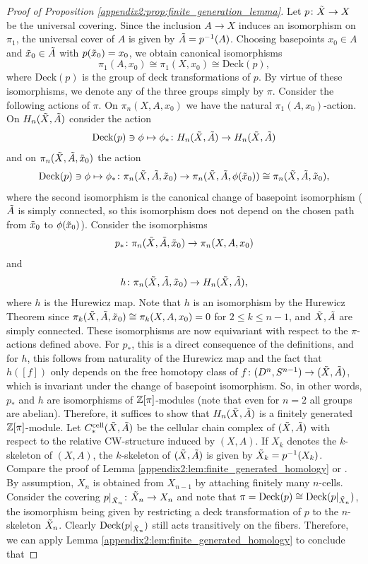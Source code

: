 \begin{proof}[Proof of Proposition \ref{appendix2:prop:finite_generation_lemma}]
    Let $p \colon \tilde{X} \to X$ be the universal covering. Since the inclusion $A \to X$ induces an isomorphism on $\pi_1$, the universal cover of $A$ is given by $\tilde{A} = p^{-1}(A)$. Choosing basepoints $x_0 \in A$ and $\tilde{x}_0 \in \tilde{A}$ with $p(\tilde{x}_0) = x_0$, we obtain canonical isomorphisms 
    \[
    \pi_1(A,x_0) \cong \pi_1(X,x_0) \cong \mathrm{Deck}(p),
    \]
    where $\mathrm{Deck}(p)$ is the group of deck transformations of $p$. By virtue of these isomorphisms, we denote any of the three groups simply by $\pi$. Consider the following actions of $\pi$. On $\pi_n(X,A,x_0)$ we have the natural $\pi_1(A,x_0)$-action. On $H_n(\tilde{X},\tilde{A})$ consider the action
    \[
    \mathrm{Deck}(p) \ni \phi \mapsto \phi_\ast \colon H_n(\tilde{X},\tilde{A}) \to H_n(\tilde{X},\tilde{A})
    \]
    and on $\pi_n(\tilde{X},\tilde{A},\tilde{x}_0)$ the action 
    \[
    \mathrm{Deck}(p) \ni \phi \mapsto \phi_\ast \colon \pi_n(\tilde{X},\tilde{A},\tilde{x}_0) \to \pi_n(\tilde{X},\tilde{A},\phi(\tilde{x}_0)) \cong \pi_n(\tilde{X},\tilde{A},\tilde{x}_0),
    \]
    where the second isomorphism is the canonical change of basepoint isomorphism ($\tilde{A}$ is simply connected, so this isomorphism does not depend on the chosen path from $\tilde{x}_0$ to $\phi(\tilde{x}_0)$). Consider the isomorphisms
    \[
    p_\ast \colon \pi_n(\tilde{X},\tilde{A},\tilde{x}_0) \to \pi_n(X,A,x_0)
    \]
    and 
    \[
    h \colon \pi_n(\tilde{X},\tilde{A},\tilde{x}_0) \to H_n(\tilde{X},\tilde{A}),
    \]
    where $h$ is the Hurewicz map. Note that $h$ is an isomorphism by the Hurewicz Theorem since $\pi_k(\tilde{X},\tilde{A},\tilde{x}_0) \cong \pi_k(X,A,x_0) = 0$ for $2 \leq k \leq n-1$, and $\tilde{X}, \tilde{A}$ are simply connected. These isomorphisms are now equivariant with respect to the $\pi$-actions defined above. For $p_\ast$, this is a direct consequence of the definitions, and for $h$, this follows from naturality of the Hurewicz map and the fact that $h([f])$ only depends on the free homotopy class of $f \colon (D^n,S^{n-1}) \to (\tilde{X},\tilde{A})$, which is invariant under the change of basepoint isomorphism. So, in other words, $p_\ast$ and $h$ are isomorphisms of $\mathbb{Z}[\pi]$-modules (note that even for $n=2$ all groups are abelian). Therefore, it suffices to show that $H_n(\tilde{X},\tilde{A})$ is a finitely generated $\mathbb{Z}[\pi]$-module. Let $C_\ast^\mathrm{cell}(\tilde{X},\tilde{A})$ be the cellular chain complex of $(\tilde{X},\tilde{A})$ with respect to the relative CW-structure induced by $(X,A)$. If $X_k$ denotes the $k$-skeleton of $(X,A)$, the $k$-skeleton of $(\tilde{X},\tilde{A})$ is given by $\tilde{X}_k = p^{-1}(X_k)$. Compare the proof of Lemma \ref{appendix2:lem:finite_generated_homology} or \cite[Prop. 2.3.9]{fritsch1990cellular}. By assumption, $X_n$ is obtained from $X_{n-1}$ by attaching finitely many $n$\nobreakdash-cells. Consider the covering $p|_{\tilde{X}_n} \colon \tilde{X}_n \to X_n$ and note that $\pi = \mathrm{Deck}(p) \cong \mathrm{Deck}(p|_{\tilde{X}_n})$, the isomorphism being given by restricting a deck transformation of $p$ to the $n$-skeleton $\tilde{X}_n$. Clearly $\mathrm{Deck}(p|_{\tilde{X}_n})$ still acts transitively on the fibers. Therefore, we can apply Lemma \ref{appendix2:lem:finite_generated_homology} to conclude that 

\end{proof}
